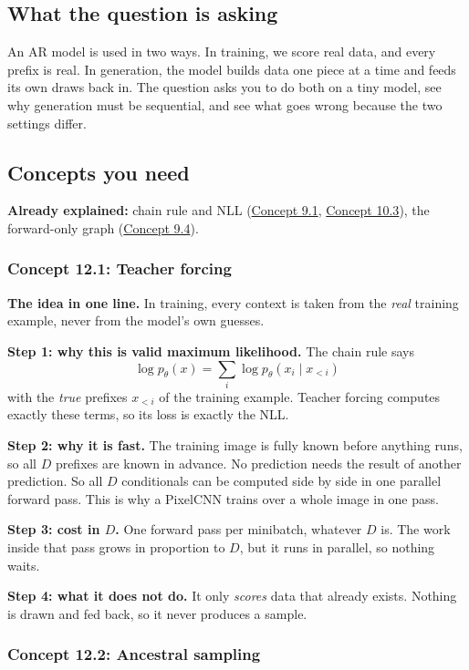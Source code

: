 \documentclass[12pt,a4paper]{article}
\begin{document}
\subsection{What the question is asking}

An AR model is used in two ways. In training, we score real data, and every prefix is real. In generation, the model builds data one piece at a time and feeds its own draws back in. The question asks you to do both on a tiny model, see why generation must be sequential, and see what goes wrong because the two settings differ.

\subsection{Concepts you need}

\textbf{Already explained:} chain rule and NLL (\hyperref[c9-1]{Concept 9.1}, \hyperref[c10-3]{Concept 10.3}), the forward-only graph (\hyperref[c9-4]{Concept 9.4}).

\subsubsection{Concept 12.1: Teacher forcing}\label{c12-1}

\textbf{The idea in one line.} In training, every context is taken from the \emph{real} training example, never from the model's own guesses.

\textbf{Step 1: why this is valid maximum likelihood.} The chain rule says
\[
\log p_\theta(x)=\sum_{i}\log p_\theta(x_i\mid x_{<i})
\]
with the \emph{true} prefixes $x_{<i}$ of the training example. Teacher forcing computes exactly these terms, so its loss is exactly the NLL.

\textbf{Step 2: why it is fast.} The training image is fully known before anything runs, so all $D$ prefixes are known in advance. No prediction needs the result of another prediction. So all $D$ conditionals can be computed side by side in one parallel forward pass. This is why a PixelCNN trains over a whole image in one pass.

\textbf{Step 3: cost in $D$.} One forward pass per minibatch, whatever $D$ is. The work inside that pass grows in proportion to $D$, but it runs in parallel, so nothing waits.

\textbf{Step 4: what it does not do.} It only \emph{scores} data that already exists. Nothing is drawn and fed back, so it never produces a sample.

\subsubsection{Concept 12.2: Ancestral sampling}\label{c12-2}
\end{document}
